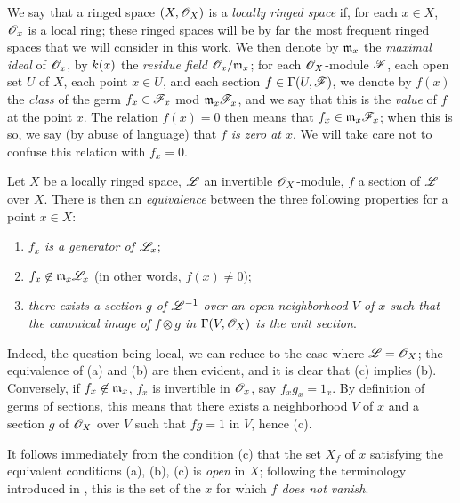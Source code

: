 \begin{env}[5.5.1]
\label{0.5.5.1}
We say that a ringed space $(X,\mathscr{O}_X)$ is a {\em locally ringed space} if, for
each $x\in X$, $\mathscr{O}_x$ is a local ring; these ringed spaces will be by far the
most frequent ringed spaces that we will consider in this work. We then denote
by $\mathfrak{m}_x$ the {\em maximal ideal} of $\mathscr{O}_x$, by $k(x)$ the
{\em residue field $\mathscr{O}_x/\mathfrak{m}_x$}; for each $\mathscr{O}_X$-module $\mathscr{F}$,
each open set $U$ of $X$, each point $x\in U$, and each section
$f\in\Gamma(U,\mathscr{F})$, we denote by $f(x)$ the {\em class} of the germ
$f_x\in\mathscr{F}_x$ mod $\mathfrak{m}_x\mathscr{F}_x$, and we say that this is the
{\em value} of $f$ at the point $x$. The relation $f(x)=0$ then means that
$f_x\in\mathfrak{m}_x\mathscr{F}_x$; when this is so, we say (by abuse of language)
that {\em $f$ is zero at $x$}. We will take care not to confuse this relation
with $f_x=0$.
\end{env}

\begin{env}[5.5.2]
\label{0.5.5.2}
Let $X$ be a locally ringed space, $\mathscr{L}$ an invertible $\mathscr{O}_X$-module, $f$ a
section of $\mathscr{L}$ over $X$. There is then an {\em equivalence} between the
three following properties for a point $x\in X$:
\begin{enumerate}[label=(\alph*)]
  \item {\em $f_x$ is a generator of $\mathscr{L}_x$};
  \item {\em $f_x\not\in\mathfrak{m}_x\mathscr{L}_x$} (in other words, $f(x)\neq 0$);
  \item {\em there exists a section $g$ of $\mathscr{L}^{-1}$ over an open
    neighborhood $V$ of $x$ such that the canonical image of $f\otimes g$
    in $\Gamma(V,\mathscr{O}_X)$  is the unit section}.
\end{enumerate}

Indeed, the question being local, we can reduce to the case where
$\mathscr{L}=\mathscr{O}_X$; the equivalence of (a) and (b) are then evident, and it is clear
that (c) implies (b). Conversely, if $f_x\not\in\mathfrak{m}_x$, $f_x$ is
invertible in $\mathscr{O}_x$, say $f_x g_x=1_x$. By definition of germs of sections,
this means that there exists a neighborhood $V$ of $x$ and a section $g$ of
$\mathscr{O}_X$ over $V$ such that $fg=1$ in $V$, hence (c).

It follows immediately from the condition (c) that the set $X_f$ of $x$ satisfying the
equivalent conditions (a), (b), (c) is {\em open} in $X$; following the terminology
introduced in , this is the set of the $x$ for which {\em $f$ does not
vanish}.
\end{env}


